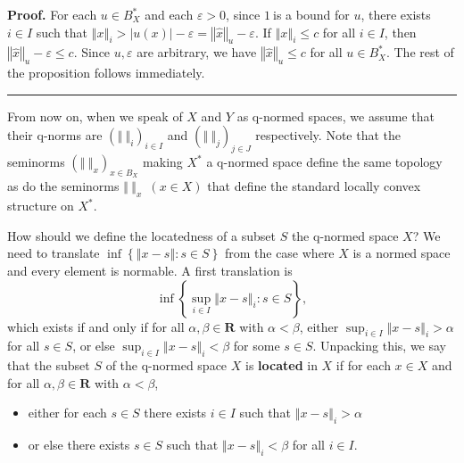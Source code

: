 \documentclass[11pt]{article}%
\newenvironment{proof}[1][Proof]{\noindent\textbf{#1.} }{\ \rule{0.5em}{0.5em}}
\begin{document}
\begin{proof}
For each $u\in B_{X}^{\ast}$ and each $\varepsilon>0$, since $1\ $is a bound
for $u$, there exists $i\in I$ such that $\left\Vert x\right\Vert
_{i}>\left\vert u(x)\right\vert -\varepsilon=\left\Vert \widehat{x}\right\Vert
_{u}-\varepsilon$. If $\left\Vert x\right\Vert _{i}\leq c$ for all $i\in I$,
then $\left\Vert \widehat{x}\right\Vert _{u}-\varepsilon\leq c$. Since
$u,\varepsilon$ are arbitrary, we have $\left\Vert \widehat{x}\right\Vert
_{u}\leq c$ for all $u\in B_{X}^{\ast}$. The rest of the proposition follows immediately.
\end{proof}

%

\medskip


From now on, when we speak of $X$ and $Y$ as q-normed spaces, we assume that
their q-norms are $\left(  \left\Vert \ \right\Vert _{i}\right)  _{i\in I}$
and $\left(  \left\Vert \ \right\Vert _{j}\right)  _{j\in J}$ respectively.
Note that the seminorms $\left(  \left\Vert \ \right\Vert _{x}\right)  _{x\in
B_{X}}$ making $X^{\ast}$ a q-normed space define the same topology as do the
seminorms $\left\Vert \ \right\Vert _{x}$\ $(x\in X)$ that define the standard
locally convex structure on $X^{\ast}$.

How should we define the locatedness of a subset $S$ the q-normed space $X$?
We need to translate $\inf\left\{  \left\Vert x-s\right\Vert :s\in S\right\}
$ from the case where $X$ is a normed space and every element is normable. A
first translation is%
\[
\inf\left\{  \sup_{i\in I}\left\Vert x-s\right\Vert _{i}:s\in S\right\}  ,
\]
which exists if and only if for all $\alpha,\beta\in\mathbf{R}$ with
$\alpha<\beta$, either $\sup_{i\in I}\left\Vert x-s\right\Vert _{i}>\alpha$
for all $s\in S$, or else $\sup_{i\in I}\left\Vert x-s\right\Vert _{i}<\beta$
for some $s\in S$. Unpacking this, we say that the subset $S$ of the q-normed
space $X$ is \textbf{located} in $X$ if for each $x\in X$ and for all
$\alpha,\beta\in\mathbf{R}$ with $\alpha<\beta$,

\begin{itemize}
\item either for each $s\in S$ there exists $i\in I$ such that $\left\Vert
x-s\right\Vert _{i}>\alpha$

\item or else there exists $s\in S$ such that $\left\Vert x-s\right\Vert
_{i}<\beta$ for all $i\in I$.
\end{itemize}
\end{document}
